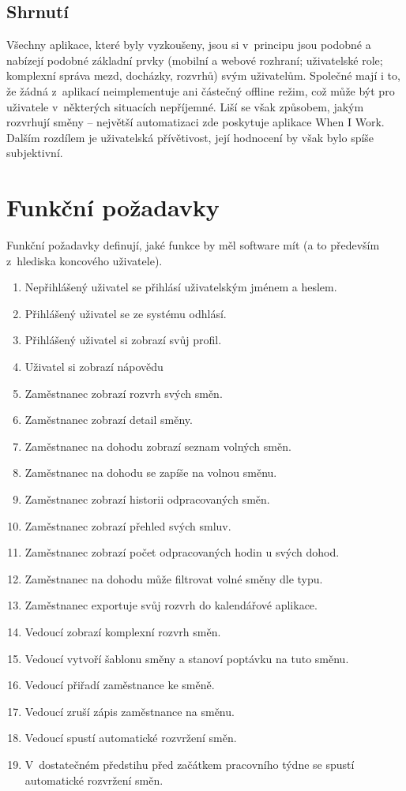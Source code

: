\documentclass[twoside]{ctuthesis}
\begin{document}
\subsection{Shrnutí}
Všechny aplikace, které byly vyzkoušeny, jsou si v~principu jsou podobné a nabízejí podobné základní prvky (mobilní a webové rozhraní; uživatelské role; komplexní správa mezd, docházky, rozvrhů) svým uživatelům. Společné mají i to, že žádná z~aplikací neimplementuje ani částečný offline režim, což může být pro uživatele v~některých situacích nepříjemné. Liší se však způsobem, jakým rozvrhují směny -- největší automatizaci zde poskytuje aplikace When I Work. Dalším rozdílem je uživatelská přívětivost, její hodnocení by však bylo spíše subjektivní.
\newpage
\section{Funkční požadavky}\label{sec:frq}
Funkční požadavky definují, jaké funkce by měl software mít (a to především z~hlediska koncového uživatele).

\begin{enumerate}[label=\textbf{F\arabic*.}]
	\item Nepřihlášený uživatel se přihlásí uživatelským jménem a heslem.
	\item Přihlášený uživatel se ze systému odhlásí.
	\item Přihlášený uživatel si zobrazí svůj profil.
	\item Uživatel si zobrazí nápovědu
	\item Zaměstnanec zobrazí rozvrh svých směn.
	\item Zaměstnanec zobrazí detail směny.
	\item Zaměstnanec na dohodu zobrazí seznam volných směn.
	\item Zaměstnanec na dohodu se zapíše na volnou směnu.
	\item Zaměstnanec zobrazí historii odpracovaných směn.
	\item Zaměstnanec zobrazí přehled svých smluv.
	\item Zaměstnanec zobrazí počet odpracovaných hodin u svých dohod.
	\item Zaměstnanec na dohodu může filtrovat volné směny dle typu.
	\item Zaměstnanec exportuje svůj rozvrh do kalendářové aplikace.
	\item Vedoucí zobrazí komplexní rozvrh směn.
	\item Vedoucí vytvoří šablonu směny a stanoví poptávku na tuto směnu.
	\item Vedoucí přiřadí zaměstnance ke směně.
	\item Vedoucí zruší zápis zaměstnance na směnu.
	\item Vedoucí spustí automatické rozvržení směn.
	\item V~dostatečném předstihu před začátkem pracovního týdne se spustí automatické rozvržení směn.
\end{enumerate}
\end{document}
